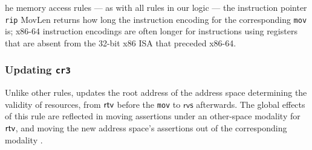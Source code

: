 he memory access rules --- as with all rules in our logic ---
 the instruction pointer \lstinline|rip| 
\textsf{MovLen} returns how long the instruction encoding for the corresponding \lstinline|mov| is;
x86-64 instruction encodings are often longer for instructions using registers that are absent from the 32-bit
x86 ISA that preceded x86-64.


\subsubsection{Updating \lstinline|cr3|} 
Unlike other rules,  updates the root address of the 
address space determining the validity of resources, from $\textsf{rtv}$ before the
\lstinline|mov| to $\textsf{rvs}$ afterwards. The global effects of this rule are reflected in moving
 assertions  under an other-space modality for  $\textsf{rtv}$, and moving the new address space's assertions out of
the corresponding modality .

